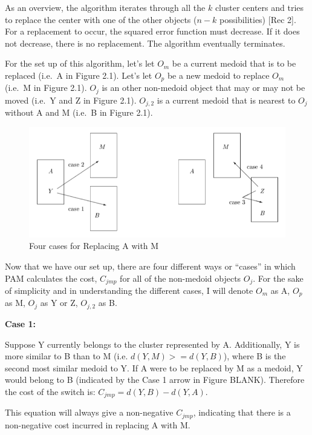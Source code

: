 \documentclass[12pt,twoside]{amherstthesis}
\begin{document}
  As an overview, the algorithm iterates through all the \(k\) cluster
  centers and tries to replace the center with one of the other objects
  (\(n-k\) possibilities) {[}Rec 2{]}. For a replacement to occur, the
  squared error function must decrease. If it does not decrease, there is
  no replacement. The algorithm eventually terminates.
  
  For the set up of this algorithm, let's let \(O_m\) be a current medoid
  that is to be replaced (i.e.~A in Figure 2.1). Let's let \(O_p\) be a
  new medoid to replace \(O_m\) (i.e.~M in Figure 2.1). \(O_j\) is an
  other non-medoid object that may or may not be moved (i.e.~Y and Z in
  Figure 2.1). \(O_{j,2}\) is a current medoid that is nearest to \(O_j\)
  without A and M (i.e.~B in Figure 2.1).
  
  \begin{figure}[htbp]
  \centering
  \includegraphics[scale = 0.5,angle = 0]{PAM_pic.png}
  \caption[Four cases for Replacing A with M]{\normalsize{Four cases for Replacing A with M}}
  \label{fig:PAM}
  \end{figure}
  
  Now that we have our set up, there are four different ways or ``cases''
  in which PAM calculates the cost, \(C_{jmp}\) for all of the non-medoid
  objects \(O_j\). For the sake of simplicity and in understanding the
  different cases, I will denote \(O_m\) as A, \(O_p\) as M, \(O_j\) as Y
  or Z, \(O_{j,2}\) as B.
  
  \textbf{Case 1:}
  
  Suppose Y currently belongs to the cluster represented by A.
  Additionally, Y is more similar to B than to M (i.e.
  \(d(Y, M) >= d(Y, B)\)), where B is the second most similar medoid to Y.
  If A were to be replaced by M as a medoid, Y would belong to B
  (indicated by the Case 1 arrow in Figure BLANK). Therefore the cost of
  the switch is: \(C_{jmp} = d(Y, B) - d(Y, A)\).
  
  This equation will always give a non-negative \(C_{jmp}\), indicating
  that there is a non-negative cost incurred in replacing A with M.
  
\end{document}
